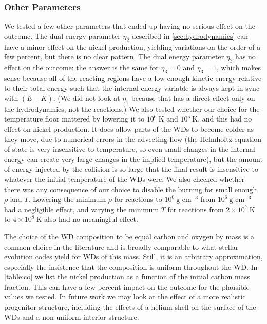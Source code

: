 \documentclass[12pt]{article}
\begin{document}
\subsubsection{Other Parameters}
\label{sec:collision_parameters:other}

We tested a few other parameters that ended up having no serious effect on the outcome.
The dual energy parameter $\eta_2$ described in \autoref{sec:hydrodynamics} can have a
minor effect on the nickel production, yielding variations on the order of a few percent,
but there is no clear pattern. The dual energy parameter $\eta_3$ has no effect on the
outcome: the answer is the same for $\eta_3 = 0$ and $\eta_3 = 1$, which makes sense
because all of the reacting regions have a low enough kinetic energy relative to their
total energy such that the internal energy variable is always kept in sync with $(E - K)$.
(We did not look at $\eta_1$ because that has a direct effect only on the hydrodynamics,
not the reactions.) We also tested whether our choice for the temperature floor mattered
by lowering it to $10^6\ \text{K}$ and $10^5\ \text{K}$, and this had no effect on nickel
production. It does allow parts of the WDs to become colder as they move, due to numerical
errors in the advecting flow (the Helmholtz equation of state is very insensitive to
temperature, so even small changes in the internal energy can create very large changes
in the implied temperature), but the amount of energy injected by the collision is so
large that the final result is insensitive to whatever the initial temperature of the
WDs were. We also checked whether there was any consequence of our choice to disable the
burning for small enough $\rho$ and $T$. Lowering the minimum $\rho$ for reactions to
$10^0\ \text{g cm}^{-3}$ from $10^6\ \text{g cm}^{-3}$ had a negligible effect,
and varying the minimum $T$ for reactions from $2 \times 10^{7}\ \text{K}$ to
$4 \times 10^{8}\ \text{K}$ also had no meaningful effect.

The choice of the WD composition to be equal carbon and oxygen by mass is a common
choice in the literature and is broadly comparable to what stellar evolution codes
yield for WDs of this mass. Still, it is an arbitrary approximation, especially the
insistence that the composition is uniform throughout the WD. In \autoref{table:co}
we list the nickel production as a function of the initial carbon mass fraction.
This can have a few percent impact on the outcome for the plausible values we tested.
In future work we may look at the effect of a more realistic progenitor structure,
including the effects of a helium shell on the surface of the WDs \citep{holcomb:2015}
and a non-uniform interior structure.
\end{document}
